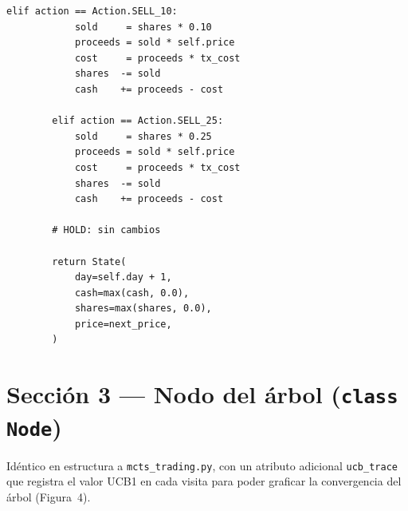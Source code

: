 \documentclass[12pt, a4paper]{article}
\begin{document}
\begin{lstlisting}[caption={Clase \texttt{State} con coste de transacción y ratio de posición}]
        elif action == Action.SELL_10:
            sold     = shares * 0.10
            proceeds = sold * self.price
            cost     = proceeds * tx_cost
            shares  -= sold
            cash    += proceeds - cost

        elif action == Action.SELL_25:
            sold     = shares * 0.25
            proceeds = sold * self.price
            cost     = proceeds * tx_cost
            shares  -= sold
            cash    += proceeds - cost

        # HOLD: sin cambios

        return State(
            day=self.day + 1,
            cash=max(cash, 0.0),
            shares=max(shares, 0.0),
            price=next_price,
        )
\end{lstlisting}

\section{Sección 3 --- Nodo del árbol (\texttt{class Node})}

Idéntico en estructura a \texttt{mcts\_trading.py}, con un atributo adicional
\texttt{ucb\_trace} que registra el valor UCB1 en cada visita para poder
graficar la convergencia del árbol (Figura~4).
\end{document}
